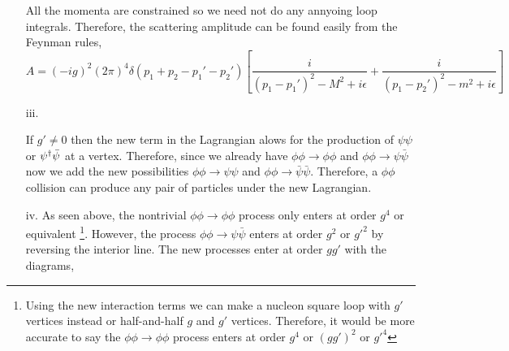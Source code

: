 \documentclass[12pt]{extarticle}
\begin{document}
\begin{enumerate}
All the momenta are constrained so we need not do any annyoing loop integrals. Therefore, the scattering amplitude can be found easily from the Feynman rules,
\[ A = (-ig)^2 (2 \pi)^4 \delta(p_1 + p_2 - p_1' - p_2') \left[ \frac{i}{(p_1 - p_1')^2 - M^2 + i \epsilon} + \frac{i}{(p_1 - p_2')^2 - m^2 + i \epsilon} \right] \]

\item[iii.]

If $g' \neq 0$ then the new term in the Lagrangian alows for the production of $\psi \psi$ or $\psi^\dagger \bar{\psi}$ at a vertex. Therefore, since we already have $\phi \phi \to \phi \phi$ and $\phi \phi \to \psi \bar{\psi}$ now we add the new possibilities $\phi \phi \to \psi \psi$ and $\phi \phi \to \bar{\psi} \bar{\psi}$. Therefore, a $\phi \phi$ collision can produce any pair of particles under the new Lagrangian.

\item[iv.] 
As seen above, the nontrivial $\phi \phi \to \phi \phi$ process only enters at order $g^4$ or equivalent \footnote{Using the new interaction terms we can make a nucleon square loop with $g'$ vertices instead or half-and-half $g$ and $g'$ vertices. Therefore, it would be more accurate to say the $\phi \phi \to \phi \phi$ process enters at order $g^4$ or $(gg')^2$ or $g'^4$}. However, the process $\phi \phi \to \psi \bar{\psi}$ enters at order $g^2$ or $g'^2$ by reversing the interior line. The new processes enter at order $g g'$ with the diagrams, 

\begin{figure}
\centering
\begin{minipage}{.5\textwidth}
\begin{center}
\end{center}
\end{minipage}%
\begin{minipage}{.5\textwidth}
\begin{center}
\end{center}
\end{minipage}
\end{figure}


\end{enumerate}
\end{document}
